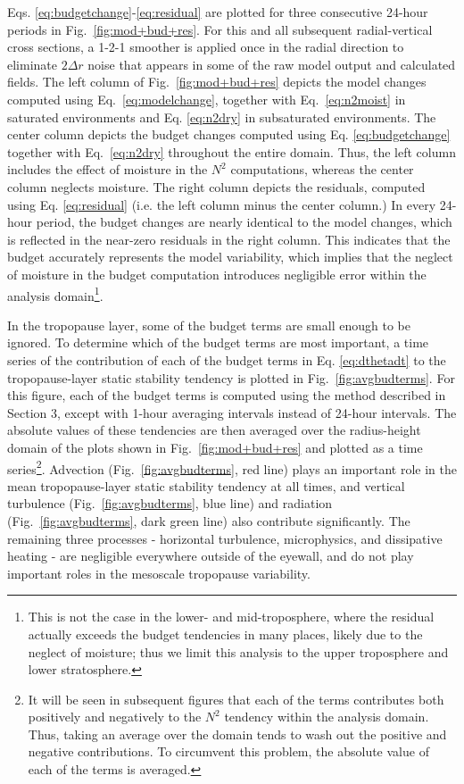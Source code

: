 Eqs. \ref{eq:budgetchange}-\ref{eq:residual} are plotted for three consecutive 24-hour periods in Fig.~\ref{fig:mod+bud+res}.
For this and all subsequent radial-vertical cross sections, a 1-2-1 smoother is applied once in the radial direction to eliminate $2\Delta r$ noise that appears in some of the raw model output and calculated fields.
      The left column of Fig.~\ref{fig:mod+bud+res} depicts the model changes computed using Eq.~\ref{eq:modelchange}, together with Eq.~\ref{eq:n2moist} in saturated environments and Eq. \ref{eq:n2dry} in subsaturated environments.
The center column depicts the budget changes computed using Eq. \ref{eq:budgetchange} together with Eq.~\ref{eq:n2dry} throughout the entire domain.
Thus, the left column includes the effect of moisture in the $N^2$ computations, whereas the center column neglects moisture.
The right column depicts the residuals, computed using Eq. \ref{eq:residual} (i.e. the left column minus the center column.)
In every 24-hour period, the budget changes are nearly identical to the model changes, which is reflected in the near-zero residuals in the right column.
This indicates that the budget accurately represents the model variability, which implies that the neglect of moisture in the budget computation introduces negligible error within the analysis domain\footnote{This is not the case in the lower- and mid-troposphere, where the residual actually exceeds the budget tendencies in many places, likely due to the neglect of moisture; thus we limit this analysis to the upper troposphere and lower stratosphere.}.

In the tropopause layer, some of the budget terms are small enough to be ignored.
To determine which of the budget terms are most important, a time series of the contribution of each of the budget terms in Eq. \ref{eq:dthetadt} to the tropopause-layer static stability tendency is plotted in Fig.~\ref{fig:avgbudterms}.
For this figure, each of the budget terms is computed using the method described in Section 3, except with 1-hour averaging intervals instead of 24-hour intervals.
The absolute values of these tendencies are then averaged over the radius-height domain of the plots shown in Fig.~\ref{fig:mod+bud+res} and plotted as a time series\footnote{It will be seen in subsequent figures that each of the terms contributes both positively and negatively to the $N^2$ tendency within the analysis domain.
Thus, taking an average over the domain tends to wash out the positive and negative contributions.
To circumvent this problem, the absolute value of each of the terms is averaged.}.
Advection (Fig.~\ref{fig:avgbudterms}, red line) plays an important role in the mean tropopause-layer static stability tendency at all times, and vertical turbulence (Fig.~\ref{fig:avgbudterms}, blue line) and radiation (Fig.~\ref{fig:avgbudterms}, dark green line) also contribute significantly.
The remaining three processes - horizontal turbulence, microphysics, and dissipative heating -  are negligible everywhere outside of the eyewall, and do not play important roles in the mesoscale tropopause variability.

